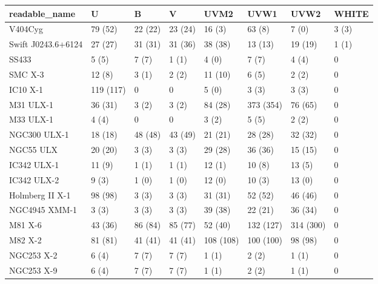 \begin{tabular}{llllllll}
\toprule
     readable_name &         U &         B &       V &      UVM2 &      UVW1 &      UVW2 & WHITE \\
\midrule
           V404Cyg &   79 (52) &   22 (22) & 23 (24) &    16 (3) &    63 (8) &     7 (0) & 3 (3) \\
Swift J0243.6+6124 &   27 (27) &   31 (31) & 31 (36) &   38 (38) &   13 (13) &   19 (19) & 1 (1) \\
             SS433 &     5 (5) &     7 (7) &   1 (1) &     4 (0) &     7 (7) &     4 (4) &     0 \\
           SMC X-3 &    12 (8) &     3 (1) &   2 (2) &   11 (10) &     6 (5) &     2 (2) &     0 \\
          IC10 X-1 & 119 (117) &         0 &       0 &     5 (0) &     3 (3) &     3 (3) &     0 \\
         M31 ULX-1 &   36 (31) &     3 (2) &   3 (2) &   84 (28) & 373 (354) &   76 (65) &     0 \\
         M33 ULX-1 &     4 (4) &         0 &       0 &     3 (2) &     5 (5) &     2 (2) &     0 \\
      NGC300 ULX-1 &   18 (18) &   48 (48) & 43 (49) &   21 (21) &   28 (28) &   32 (32) &     0 \\
         NGC55 ULX &   20 (20) &     3 (3) &   3 (3) &   29 (28) &   36 (36) &   15 (15) &     0 \\
       IC342 ULX-1 &    11 (9) &     1 (1) &   1 (1) &    12 (1) &    10 (8) &    13 (5) &     0 \\
       IC342 ULX-2 &     9 (3) &     1 (0) &   1 (0) &    12 (0) &    10 (3) &    13 (0) &     0 \\
   Holmberg II X-1 &   98 (98) &     3 (3) &   3 (3) &   31 (31) &   52 (52) &   46 (46) &     0 \\
     NGC4945 XMM-1 &     3 (3) &     3 (3) &   3 (3) &   39 (38) &   22 (21) &   36 (34) &     0 \\
           M81 X-6 &   43 (36) &   86 (84) & 85 (77) &   52 (40) & 132 (127) & 314 (300) &     0 \\
           M82 X-2 &   81 (81) &   41 (41) & 41 (41) & 108 (108) & 100 (100) &   98 (98) &     0 \\
        NGC253 X-2 &     6 (4) &     7 (7) &   7 (7) &     1 (1) &     2 (2) &     1 (1) &     0 \\
        NGC253 X-9 &     6 (4) &     7 (7) &   7 (7) &     1 (1) &     2 (2) &     1 (1) &     0 \\

\end{tabular}
